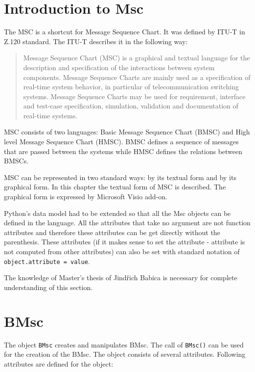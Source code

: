 \documentclass[11pt,oneside]{fithesis2}
\newcommand{\T}[1]{\texttt{#1}}
\begin{document}
\section{Introduction to Msc}
The MSC is a shortcut for Message Sequence Chart. It was defined by ITU-T\cite{itu-t} in Z.120\cite{z120} standard. The ITU-T describes it in the following way:
\begin{quote}
Message Sequence Chart (MSC) is a graphical and textual language for the description and specification of the interactions between system components. Message Sequence Charts are mainly used as a specification of real-time system behavior, in particular of telecommunication switching systems. Message Sequence Charts may be used for requirement, interface and test-case specification, simulation, validation and documentation of real-time systems.\cite{itdef}
\end{quote}

MSC consists of two languages: Basic Message Sequence Chart (BMSC) and High level Message Sequence Chart (HMSC). BMSC defines a sequence of messages that are passed between the systems while HMSC defines the relations between BMSCs.

MSC can be represented in two standard ways: by its textual form and by its graphical form. In this chapter the textual form of MSC is described. The graphical form is expressed by Microsoft Visio add-on\cite{visio}.

Python's data model had to be extended so that all the Msc objects can be defined in the language. All the attributes that take no argument are not function attributes and therefore these attributes can be get directly without the parenthesis. These attributes (if it makes sense to set the attribute - attribute is not computed from other attributes) can also be set with standard notation of \T{object.attribute = value}.

The knowledge of Master's thesis of Jindřich Babica\cite{babica} is necessary for complete understanding of this section.

\section{BMsc}
The object \T{BMsc} creates and manipulates BMsc. The call of \T{BMsc()} can be used for the creation of the BMsc. The object consists of several attributes. Following attributes are defined for the object:
\end{document}
